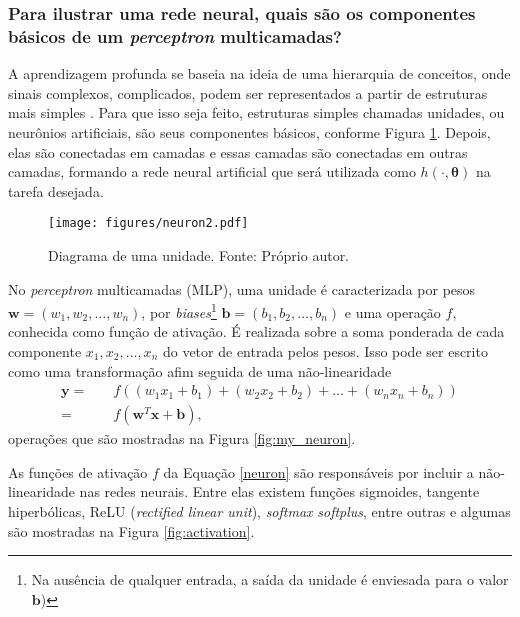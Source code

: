 \subsubsection{Para ilustrar uma rede neural, quais são os componentes básicos de um \textit{perceptron} multicamadas?}

A aprendizagem profunda se baseia na ideia de uma hierarquia de conceitos, onde sinais complexos, complicados, podem ser representados a partir de estruturas mais simples \cite[págs. 1,2]{goodfellow2016deep}. Para que isso seja feito, estruturas simples chamadas unidades, ou neurônios artificiais, são seus componentes básicos, conforme Figura \ref{fig:my_neuron}. Depois, elas são conectadas em camadas e essas camadas são conectadas em outras camadas, formando a rede neural artificial que será utilizada como $h(\cdot, \bm{\theta})$ na tarefa desejada.


\begin{figure}[htpb]
\texttt{[image: figures/neuron2.pdf]}
\caption[Diagrama de uma unidade.]{Diagrama de uma unidade. Fonte: Próprio autor. }
\label{fig:my_neuron}
\end{figure}

No \textit{perceptron} multicamadas (MLP), uma unidade é caracterizada por pesos $\bm{w} = (w_1, w_2, \dots, w_n)$, por \textit{biases}\footnote{Na ausência de qualquer entrada, a saída da unidade é enviesada para o valor $\mathbf{b}$)} $\mathbf{b} = (b_1, b_2, \dots, b_n) $ e uma operação $f$, conhecida como função de ativação. É realizada sobre a soma ponderada de cada componente $x_1, x_2, \dots, x_n$ do vetor de entrada pelos pesos. Isso pode ser escrito como uma transformação afim seguida de uma não-linearidade 
\begin{equation}
\begin{aligned}
\mathbf{y} = & \quad f\left( (w_1 x_1 + b_1) + (w_2 x_2+ b_2) + \dots + (w_n x_n + b_n) \right) \\
= & \quad f\left( \bm{w}^T \mathbf{x} + \mathbf{b}\right),
\label{neuron}
\end{aligned}
\end{equation}
operações que são mostradas na Figura \eqref{fig:my_neuron}.



As funções de ativação $f$ da Equação \eqref{neuron} são responsáveis por incluir a não-linearidade nas redes neurais. Entre elas existem funções sigmoides, tangente hiperbólicas, ReLU (\textit{rectified linear unit}), \textit{softmax} \textit{softplus}, entre outras \cite[págs. 69, 175, 184-6, 195]{goodfellow2016deep} e algumas são mostradas na Figura \ref{fig:activation}.


